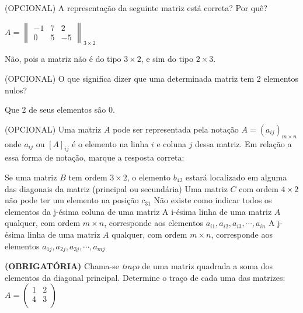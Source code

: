 \documentclass[pdftex, brazil, 12pt, oneside, addpoints]{exam}
\newcommand{\vf}[1][{}]{%
  \fillin[#1][0.25in]%
}
\begin{document}
\begin{questions}

\question
(OPCIONAL) A representação da seguinte matriz está correta? Por quê?

$A = \begin{Vmatrix}
  -1 & 7 & 2\\
  0 & 5 & -5\end{Vmatrix}_{3 \times 2}$
\begin{solution}
  Não, pois a matriz não é do tipo $3 \times 2$, e sim do tipo
  $2 \times 3$.
\end{solution}

\question
(OPCIONAL) O que significa dizer que uma determinada matriz tem 2 elementos nulos?
\begin{solution}
  Que 2 de seus elementos são $0$.
\end{solution}

\question
(OPCIONAL) Uma matriz $A$ pode ser representada pela notação $A = (a_{ij})_{m \times n}$
onde $a_{ij}$ ou $[A]_{ij}$ é o elemento na linha $i$ e coluna $j$ dessa
matriz. Em relação a essa forma de notação, marque a resposta correta:
\begin{checkboxes}
  \choice Se uma matriz $B$ tem ordem $3 \times 2$, o elemento $b_{42}$ estará
  localizado em alguma das diagonais da matriz (principal ou secundária)
  \choice Uma matriz $C$ com ordem $4 \times 2$ não pode ter um elemento
  na posição $c_{31}$
  \choice Não existe como indicar todos os elementos da j-ésima coluna de uma matriz
  \CorrectChoice A i-ésima linha de uma matriz $A$ qualquer, com ordem $m \times n$, corresponde aos
  elementos $a_{i1}, a_{i2}, a_{i3}, \cdots, a_{in}$
  \choice A j-ésima linha de uma matriz $A$ qualquer, com ordem $m \times n$, corresponde aos
  elementos $a_{1j}, a_{2j}, a_{3j}, \cdots, a_{mj}$
\end{checkboxes}

\question
\textbf{(OBRIGATÓRIA)} Chama-se \emph{traço} de uma matriz quadrada a soma dos elementos da
diagonal principal. Determine o traço de cada uma das matrizes:\\%
$A = \begin{pmatrix}
  1 & 2\\
  4 & 3\\
\end{pmatrix}$


\end{questions}
\end{document}
